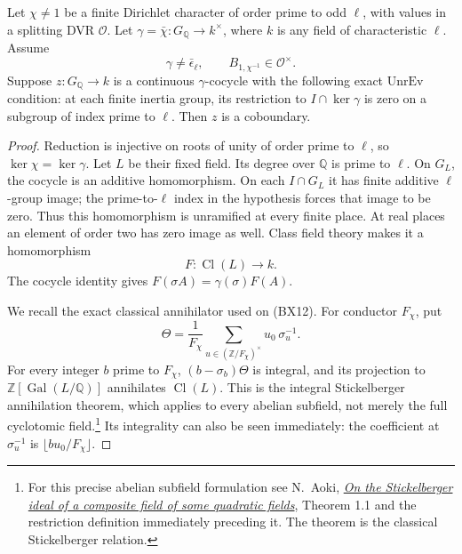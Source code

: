 \begin{srlemma}\label{lem:sr-bernoulli-unit-residual-unramified}
Let \(\chi\ne1\) be a finite Dirichlet character of order
prime to odd \(\ell\), with values in a splitting DVR
\(\mathcal O\).
Let \(\gamma=\bar\chi:G_{\mathbb Q}\to k^\times\),
where \(k\) is any field of characteristic \(\ell\).
Assume
\[
          \gamma\ne\bar\epsilon_\ell,\qquad
                         B_{1,\chi^{-1}}\in\mathcal O^\times.
 \tag{BX11}
\]
Suppose \(z:G_{\mathbb Q}\to k\) is a continuous
\(\gamma\)-cocycle with the following exact
\(\mathrm{UnrEv}\) condition:
at each finite inertia group, its restriction to
\(I\cap\ker\gamma\) is zero on a subgroup of
index prime to \(\ell\).
Then \(z\) is a coboundary.
\end{srlemma}
\begin{proof}
Reduction is injective on roots of unity of order prime
to \(\ell\), so \(\ker\chi=\ker\gamma\).
Let \(L\) be their fixed field.
Its degree over \(\mathbb Q\) is prime to \(\ell\).
On \(G_L\), the cocycle is an additive homomorphism.
On each \(I\cap G_L\) it has finite additive
\(\ell\)-group image; the prime-to-\(\ell\) index in the
hypothesis forces that image to be zero.
Thus this homomorphism is unramified at every finite
place.
At real places an element of order two has zero image
as well.
Class field theory makes it a homomorphism
\[
                         F:\operatorname{Cl}(L)\longrightarrow k .
 \tag{BX12}
\]
The cocycle identity gives
\(F(\sigma A)=\gamma(\sigma)F(A)\).

We recall the exact classical annihilator used on (BX12).
For conductor \(F_\chi\), put
\[
 \Theta=\frac1{F_\chi}
       \sum_{u\in(\mathbb Z/F_\chi)^\times}
                       u_0\,\sigma_u^{-1}.
\]
For every integer \(b\) prime to \(F_\chi\),
\((b-\sigma_b)\Theta\) is integral, and its projection
to \(\mathbb Z[\operatorname{Gal}(L/\mathbb Q)]\)
annihilates \(\operatorname{Cl}(L)\).
This is the integral Stickelberger annihilation theorem,
which applies to every abelian subfield, not merely the
full cyclotomic field.\footnote{For this precise abelian
subfield formulation see N.~Aoki,
\href{https://archive.mpim-bonn.mpg.de/id/eprint/743/1/preprint_1990_16.pdf}
{\emph{On the Stickelberger ideal of a composite field of
some quadratic fields}}, Theorem 1.1 and the restriction
definition immediately preceding it.
The theorem is the classical Stickelberger relation.}
Its integrality can also be seen immediately:
the coefficient at \(\sigma_u^{-1}\) is
\(\lfloor bu_0/F_\chi\rfloor\).


\end{proof}
